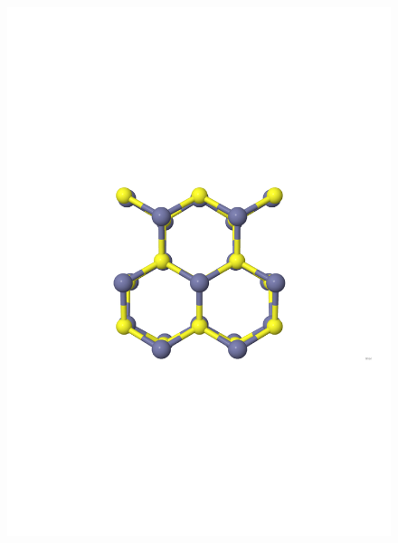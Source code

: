 \documentclass[11pt,oneside,czech,american]{book} %
\theoremstyle{definition} %
\theoremstyle{definition}
\begin{document}
\begin{figure}[H]
	\includegraphics[scale=0.26]{wurtzite_nolabels.pdf}

\end{figure}
\end{document}
